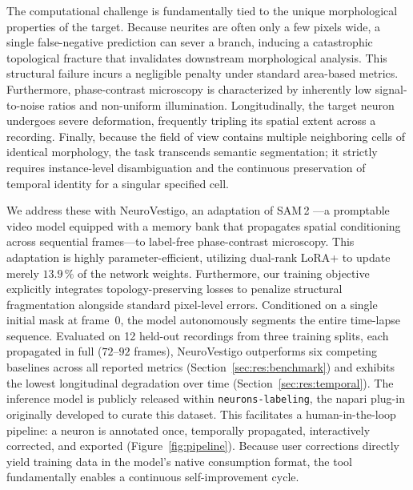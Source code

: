 \documentclass[11pt,a4paper]{article}
\begin{document}
The computational challenge is fundamentally tied to the unique
morphological properties of the target. Because neurites are often only a
few pixels wide, a single false-negative prediction can sever a branch,
inducing a catastrophic topological fracture that invalidates downstream
morphological analysis. This structural failure incurs a
negligible penalty under standard area-based metrics. Furthermore, phase-contrast microscopy is
characterized by inherently low signal-to-noise ratios and non-uniform
illumination. Longitudinally, the target neuron undergoes severe deformation, frequently tripling its spatial extent across a recording.
Finally, because the field of view contains multiple neighboring cells of
identical morphology, the task transcends semantic segmentation; it strictly
requires instance-level disambiguation and the continuous preservation of
temporal identity for a singular specified cell.

We address these with NeuroVestigo, an adaptation of SAM\,2
\cite{ravi2025sam2}---a promptable video model equipped with a memory bank
that propagates spatial conditioning across sequential frames---to label-free
phase-contrast microscopy. This
adaptation is highly parameter-efficient, utilizing dual-rank LoRA+ to
update merely $13.9\,\%$ of the network weights. Furthermore, our training
objective explicitly integrates topology-preserving losses to penalize
structural fragmentation alongside standard pixel-level errors. Conditioned
on a single initial mask at frame~0, the model autonomously segments the
entire time-lapse sequence. Evaluated on 12 held-out recordings from three
training splits, each propagated in full ($72$--$92$ frames), NeuroVestigo outperforms six
competing baselines across all reported metrics
(Section~\ref{sec:res:benchmark}) and exhibits the lowest longitudinal
degradation over time (Section~\ref{sec:res:temporal}). The inference model
is publicly released within \texttt{neurons-labeling}, the napari plug-in
originally developed to curate this dataset. This facilitates a
human-in-the-loop pipeline: a neuron is annotated once, temporally
propagated, interactively corrected, and exported
(Figure~\ref{fig:pipeline}). Because user corrections directly yield
training data in the model's native consumption format, the tool
fundamentally enables a continuous self-improvement cycle.
\end{document}
